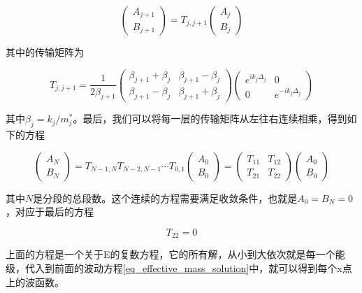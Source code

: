 \documentclass{ZJUthesis}
\begin{document}
\begin{equation}
    \label{eq_tmm}
    \begin{pmatrix} A_{j+1} \\ B_{j+1} \end{pmatrix} = T_{j,j+1} \begin{pmatrix} A_{j} \\ B_{j} \end{pmatrix}
\end{equation}

其中的传输矩阵为

\begin{equation}
    \label{eq_transfer_matrix}
    T_{j,j+1} = \frac{1}{2\beta_{j+1}} \begin{pmatrix} \beta_{j+1}+\beta_j & \beta_{j+1}-\beta_j  \\ \beta_{j+1}-\beta_j  & \beta_{j+1}+\beta_j  \end{pmatrix} \begin{pmatrix} e^{ik_j\Delta_j} & 0 \\ 0 & e^{-ik_j\Delta_j} \end{pmatrix}
\end{equation}

其中$\beta_j = k_j/m^*_j$。最后，我们可以将每一层的传输矩阵从左往右连续相乘，得到如下的方程

\begin{equation}
    \label{eq_tmm_serial}
    \begin{pmatrix} A_{N} \\ B_{N} \end{pmatrix} = T_{N-1,N}T_{N-2,N-1}\cdots T_{0,1} \begin{pmatrix} A_{0} \\ B_{0} \end{pmatrix} =  \begin{pmatrix} T_{11} & T_{12} \\ T_{21} & T_{22} \end{pmatrix} \begin{pmatrix} A_{0} \\ B_{0} \end{pmatrix}
\end{equation}

其中$N$是分段的总段数。这个连续的方程需要满足收敛条件，也就是$A_0=B_N=0$，对应于最后的方程

\begin{equation}
    \label{eq_t22}
    T_{22}=0
\end{equation}

上面的方程是一个关于E的复数方程，它的所有解，从小到大依次就是每一个能级，代入到前面的波动方程\ref{eq_effective_mass_solution}中，就可以得到每个x点上的波函数。
\end{document}
